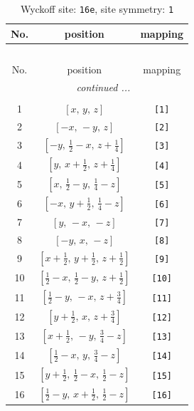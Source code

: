 \documentclass[fleqn,8pt]{jsarticle}
\begin{document}
\begin{longtable}{ccc}
\caption{Wyckoff site: {\tt 16e}, site symmetry: {\tt 1}}
 \\
 \hline \hline
No. & position & mapping \\ \hline \endfirsthead

\multicolumn{2}{l}{\tablename\ \thetable{}} \\
 \hline \hline
No. & position & mapping \\ \hline \endhead

 \hline \hline
\multicolumn{2}{r}{\footnotesize\it continued ...} \\ \endfoot

 \hline \hline
\multicolumn{2}{r}{} \\ \endlastfoot

1 & $\left[ x,\, y,\, z \right]$ & {\tt [1]} \\ \hline
2 & $\left[ - x,\, - y,\, z \right]$ & {\tt [2]} \\ \hline
3 & $\left[ - y,\, \frac{1}{2} - x,\, z + \frac{1}{4} \right]$ & {\tt [3]} \\ \hline
4 & $\left[ y,\, x + \frac{1}{2},\, z + \frac{1}{4} \right]$ & {\tt [4]} \\ \hline
5 & $\left[ x,\, \frac{1}{2} - y,\, \frac{1}{4} - z \right]$ & {\tt [5]} \\ \hline
6 & $\left[ - x,\, y + \frac{1}{2},\, \frac{1}{4} - z \right]$ & {\tt [6]} \\ \hline
7 & $\left[ y,\, - x,\, - z \right]$ & {\tt [7]} \\ \hline
8 & $\left[ - y,\, x,\, - z \right]$ & {\tt [8]} \\ \hline
9 & $\left[ x + \frac{1}{2},\, y + \frac{1}{2},\, z + \frac{1}{2} \right]$ & {\tt [9]} \\ \hline
10 & $\left[ \frac{1}{2} - x,\, \frac{1}{2} - y,\, z + \frac{1}{2} \right]$ & {\tt [10]} \\ \hline
11 & $\left[ \frac{1}{2} - y,\, - x,\, z + \frac{3}{4} \right]$ & {\tt [11]} \\ \hline
12 & $\left[ y + \frac{1}{2},\, x,\, z + \frac{3}{4} \right]$ & {\tt [12]} \\ \hline
13 & $\left[ x + \frac{1}{2},\, - y,\, \frac{3}{4} - z \right]$ & {\tt [13]} \\ \hline
14 & $\left[ \frac{1}{2} - x,\, y,\, \frac{3}{4} - z \right]$ & {\tt [14]} \\ \hline
15 & $\left[ y + \frac{1}{2},\, \frac{1}{2} - x,\, \frac{1}{2} - z \right]$ & {\tt [15]} \\ \hline
16 & $\left[ \frac{1}{2} - y,\, x + \frac{1}{2},\, \frac{1}{2} - z \right]$ & {\tt [16]} \\
\end{longtable}
\end{document}

